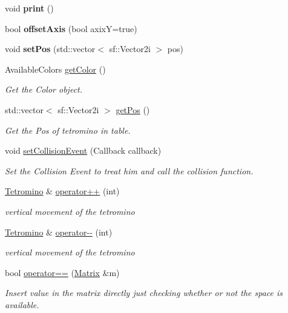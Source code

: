 \begin{DoxyCompactItemize}
void {\bfseries print} ()
\item 
\mbox{\label{classTetromino_a612c515834ce52a37afe7ae39efcbd57}} 
bool {\bfseries offset\+Axis} (bool axixY=true)
\item 
\mbox{\label{classTetromino_a15a56c14bed5825cbb0da098bdba6ca2}} 
void {\bfseries set\+Pos} (std\+::vector$<$ sf\+::\+Vector2i $>$ pos)
\item 
Available\+Colors \hyperlink{classTetromino_ad5594cc33ab35ec97b8eb3593e74b787}{get\+Color} ()
\begin{DoxyCompactList}\small\item\em Get the Color object. \end{DoxyCompactList}\item 
std\+::vector$<$ sf\+::\+Vector2i $>$ \hyperlink{classTetromino_a8c9202a6d41354fd5555cca89cec0703}{get\+Pos} ()
\begin{DoxyCompactList}\small\item\em Get the Pos of tetromino in table. \end{DoxyCompactList}\item 
void \hyperlink{classTetromino_a3ac5e896c58ed8490beac9ee833431e6}{set\+Collision\+Event} (Callback callback)
\begin{DoxyCompactList}\small\item\em Set the Collision Event to treat him and call the collision function. \end{DoxyCompactList}\item 
\hyperlink{classTetromino}{Tetromino} \& \hyperlink{classTetromino_ab4dd61078d1383df779f5f615d352a17}{operator++} (int)
\begin{DoxyCompactList}\small\item\em vertical movement of the tetromino \end{DoxyCompactList}\item 
\hyperlink{classTetromino}{Tetromino} \& \hyperlink{classTetromino_a3921b7fc54aca4d294b74b487d8c4183}{operator-\/-\/} (int)
\begin{DoxyCompactList}\small\item\em vertical movement of the tetromino \end{DoxyCompactList}\item 
bool \hyperlink{classTetromino_aea3c0024088f53627d766fba6a3fb4e4}{operator==} (\hyperlink{classMatrix}{Matrix} \&m)
\begin{DoxyCompactList}\small\item\em Insert value in the matrix directly just checking whether or not the space is available. \end{DoxyCompactList}\item 

\end{DoxyCompactItemize}
